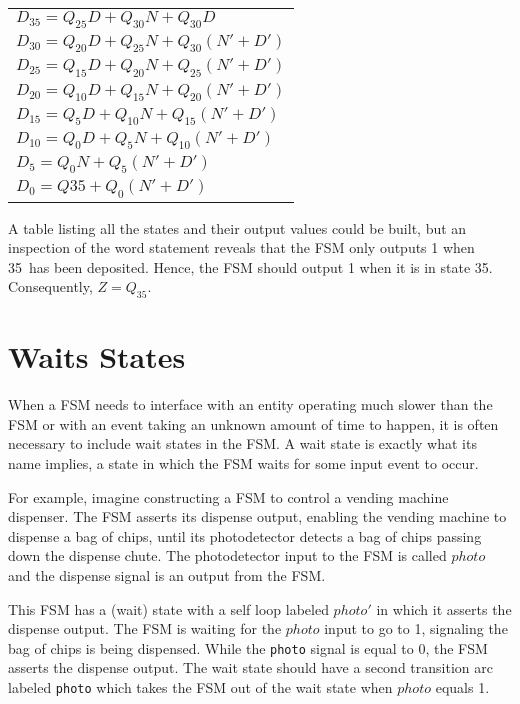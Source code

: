 \begin{tabular}{l}

    $D_{35} = Q_{25}D + Q_{30}N + Q_{30}D$ \\
    $D_{30} = Q_{20}D + Q_{25}N + Q_{30}(N'+D')$ \\
    $D_{25} = Q_{15}D + Q_{20}N + Q_{25}(N'+D')$ \\
    $D_{20} = Q_{10}D + Q_{15}N + Q_{20}(N'+D')$ \\
    $D_{15} = Q_{5}D +  Q_{10}N + Q_{15}(N'+D')$ \\
    $D_{10} = Q_{0}D +  Q_{5}N  + Q_{10}(N'+D')$ \\
    $D_{5}  =           Q_{0}N  + Q_{5}(N'+D')$ \\
    $D_{0}  = Q{35} + Q_{0}(N'+D')$ \\

\end{tabular}

A table listing all the states and their output values could be built,
but an inspection of the word statement reveals that the FSM only
outputs 1 when 35\textcent~has been deposited.  Hence, the FSM should
output 1 when it is in state 35\textcent.  Consequently, $Z=Q_{35}$.


\section{Waits States}
When a FSM needs to interface with an entity operating much
slower than the FSM or with an event taking an unknown amount
of time to happen, it is often necessary to include wait states in
the FSM.  A wait state is exactly what its name implies, a state in
which the FSM waits for some input event to occur.

For example, imagine  constructing a FSM to control
a vending machine dispenser.  The FSM asserts its dispense output,
enabling the vending machine to dispense a bag of chips, until its
photodetector detects a bag of chips passing down the
dispense chute.  The photodetector input to the FSM is called
$photo$ and the dispense signal is an output from the FSM.

This FSM has a (wait) state with a self loop labeled
$photo'$ in which it asserts the dispense output.  The FSM is
waiting for the $photo$ input to go to 1, signaling the bag of
chips is being dispensed.  While the \verb+photo+ signal is equal to
0, the FSM asserts the dispense output.  The wait state should have
a second transition arc labeled \verb+photo+ which takes the FSM out
of the wait state when $photo$ equals 1.

